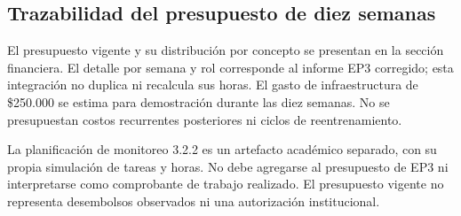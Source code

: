 \subsection{Trazabilidad del presupuesto de diez semanas}

El presupuesto vigente y su distribución por concepto se presentan en la sección financiera. El detalle por semana y rol corresponde al informe EP3 corregido; esta integración no duplica ni recalcula sus horas. El gasto de infraestructura de \$250.000 se estima para demostración durante las diez semanas. No se presupuestan costos recurrentes posteriores ni ciclos de reentrenamiento.

La planificación de monitoreo 3.2.2 es un artefacto académico separado, con su propia simulación de tareas y horas. No debe agregarse al presupuesto de EP3 ni interpretarse como comprobante de trabajo realizado. El presupuesto vigente no representa desembolsos observados ni una autorización institucional.
